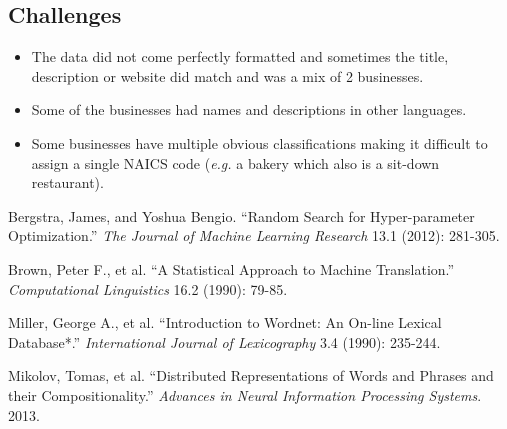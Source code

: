 \documentclass[letterpaper, 9 pt, conference]{IEEEtran}
\begin{document}
\subsection{Challenges}
\begin{itemize}

\item The data did not come perfectly formatted and sometimes the title, description or website did match and was a mix of 2 businesses.
\item Some of the businesses had names and descriptions in other languages.
\item Some businesses have multiple obvious classifications making it difficult to assign a single NAICS code (\textit{e.g.} a bakery which also is a sit-down restaurant).

\end{itemize}

\begin{thebibliography}{99}

 Bergstra, James, and Yoshua Bengio. ``Random Search for Hyper-parameter Optimization.'' \textit{The Journal of Machine Learning Research} 13.1 (2012): 281-305.

 Brown, Peter F., et al. ``A Statistical Approach to Machine Translation.'' \textit{Computational Linguistics} 16.2 (1990): 79-85.

 Miller, George A., et al. ``Introduction to Wordnet: An On-line Lexical Database*.'' \textit{International Journal of Lexicography} 3.4 (1990): 235-244.

 Mikolov, Tomas, et al. ``Distributed Representations of Words and Phrases and their Compositionality.'' \textit{Advances in Neural Information Processing Systems}. 2013.

\end{thebibliography}

\addtolength{\textheight}{-12cm}   %

\ifx
\newpage
\end{document}
